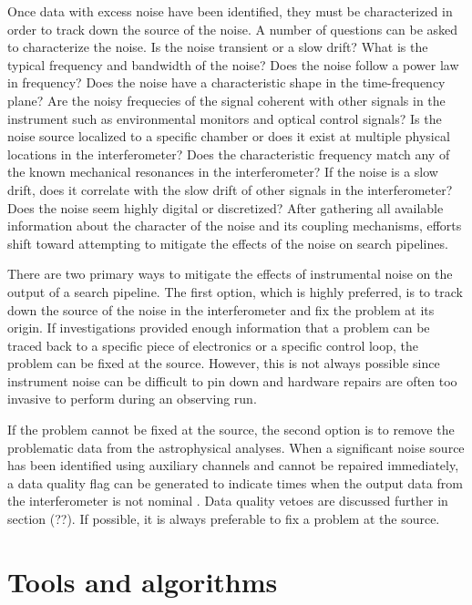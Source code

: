 Once data with excess noise have been identified, they must be characterized 
in order to track down the source of the noise. A number of questions can 
be asked to characterize the noise. Is the noise transient or a slow 
drift? What is the typical frequency and bandwidth of the noise? Does the 
noise follow a power law in frequency? Does the 
noise have a characteristic shape in the time-frequency plane? Are the 
noisy frequecies of the signal coherent with other signals in the instrument 
such as environmental monitors and optical control signals? 
Is the noise source localized to a specific chamber or does it exist at 
multiple physical locations in the interferometer? Does the characteristic 
frequency match any of the known mechanical resonances in the interferometer? 
If the noise is a slow drift, does it correlate with the slow drift of 
other signals in the interferometer? Does the noise seem highly digital 
or discretized? After gathering all available information about the 
character of the noise and its coupling mechanisms, efforts shift 
toward attempting to mitigate the effects of the noise on search 
pipelines. 

There are two primary ways to mitigate the effects of instrumental noise on 
the output of a search pipeline. The first option, which is highly preferred, 
is to track down the source of the noise in the interferometer and fix the 
problem at its origin. If investigations provided enough information that 
a problem can be traced back to a specific piece of electronics or a 
specific control loop, the problem can be fixed at the source. However, 
this is not always possible since instrument noise can be difficult to 
pin down and hardware repairs are often too invasive to perform during 
an observing run.

If the problem cannot be fixed at the source, the second option is to 
remove the problematic data from the astrophysical analyses. 
When a significant noise source has
been identified using auxiliary channels and cannot be repaired immediately, 
a data quality flag can be generated
to indicate times when the output data from the interferometer is not nominal
\cite{Nuttall:2015dqa,S6DetChar,GW150914-DETCHAR,Amaldi}.
Data quality vetoes are discussed further in section (??).  
If possible, it is always preferable to fix a problem at the source. 

\section{Tools and algorithms}\label{sec:tools}

